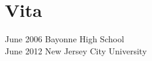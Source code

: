 \newpage
{}
\chapter*{Vita}

June 2006 \dotfill Bayonne High School\\
June 2012 \dotfill New Jersey City University

\restoregeometry
